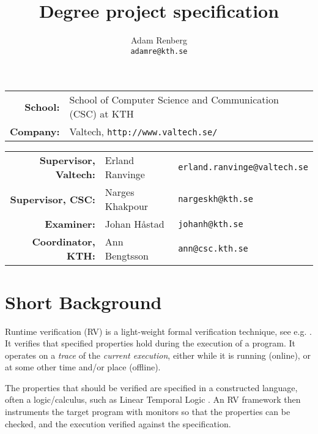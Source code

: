 \documentclass[a4paper,11pt]{article}
\begin{document}
\setlength\parindent{0em}
\setlength\parskip{1em}


\title{Degree project specification}
\author{Adam Renberg\\\texttt{adamre@kth.se}}

\maketitle

\begin{tabular}{rll}
	\textbf{School:}  & School of Computer Science and Communication (CSC) at KTH \\
    \textbf{Company:} & Valtech, \texttt{http://www.valtech.se/} \\
\end{tabular}

\begin{tabular}{rll}
	\textbf{Supervisor, Valtech:} & Erland Ranvinge & \texttt{erland.ranvinge@valtech.se} \\
    \textbf{Supervisor, CSC:}     & Narges Khakpour & \texttt{nargeskh@kth.se} \\
    \textbf{Examiner:}		  & Johan Håstad	& \texttt{johanh@kth.se} \\
    \textbf{Coordinator, KTH:}	  & Ann Bengtsson & \texttt{ann@csc.kth.se} \\
\end{tabular}


\begin{spacing}{0.8}
\setlength\parskip{0.1em}
\tableofcontents
\end{spacing}

\section{Short Background}

Runtime verification (RV) is a light-weight formal verification technique, see e.g. \cite{leucker08,delgado04}.
It verifies that specified properties hold during the execution of a program. It operates on a \emph{trace} of the \emph{current execution}, either while it is running (online), or at some other time and/or place (offline).

The properties that should be verified are specified in a constructed
language, often a logic/calculus, such as Linear Temporal Logic \cite{pnueli77}.
An RV framework then instruments the target program with monitors so that the properties
can be checked, and the execution verified against the specification.
\end{document}
